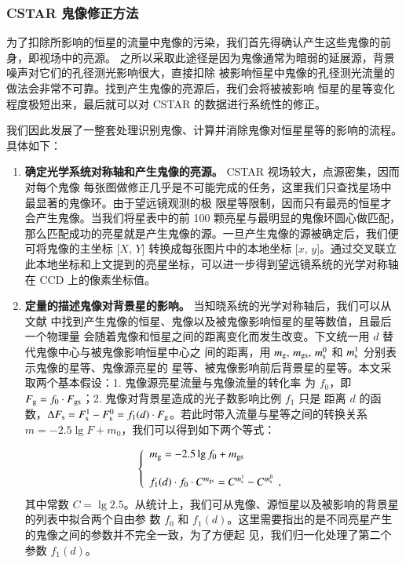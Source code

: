 \subsubsection{CSTAR 鬼像修正方法}

为了扣除所影响的恒星的流量中鬼像的污染，我们首先得确认产生这些鬼像的前身，即视场中的亮源。
之所以采取此途径是因为鬼像通常为暗弱的延展源，背景噪声对它们的孔径测光影响很大，直接扣除
被影响恒星中鬼像的孔径测光流量的做法会非常不可靠。找到产生鬼像的亮源后，我们会将被被影响
恒星的星等变化程度极短出来，最后就可以对 CSTAR 的数据进行系统性的修正。

我们因此发展了一整套处理识别鬼像、计算并消除鬼像对恒星星等的影响的流程。具体如下：

\begin{enumerate}[leftmargin=1\parindent]

\item \textbf{确定光学系统对称轴和产生鬼像的亮源。} CSTAR 视场较大，点源密集，因而对每个鬼像
每张图做修正几乎是不可能完成的任务，这里我们只查找星场中最显著的鬼像环。由于望远镜观测的极
限星等限制，因而只有最亮的恒星才会产生鬼像。当我们将星表中的前 100 颗亮星与最明显的鬼像环圆心做匹配，那么匹配成功的亮星就是产生鬼像的源。一旦产生鬼像的源被确定后，我们便可将鬼像的主坐标 [$X$, $Y$] 转换成每张图片中的本地坐标 [$x$, $y$]。通过交叉联立此本地坐标和上文提到的亮星坐标，可以进一步得到望远镜系统的光学对称轴在 CCD 上的像素坐标值。

\item \textbf{定量的描述鬼像对背景星的影响。} 当知晓系统的光学对称轴后，我们可以从文献 
 中找到产生鬼像的恒星、鬼像以及被鬼像影响恒星的星等数值，且最后一个物理量
会随着鬼像和恒星之间的距离变化而发生改变。下文统一用 $d$ 替代鬼像中心与被鬼像影响恒星中心之
间的距离，用 $m_\mathrm{g},\,m_\mathrm{gs},\,m_\mathrm{s}^0$ 和 $m_\mathrm{s}^1$ 分别表示鬼像的星等、鬼像源亮星的
星等、被鬼像影响前后背景星的星等。本文采取两个基本假设：1. 鬼像源亮星流量与鬼像流量的转化率
为 $f_0$，即 $F_{\rm{g}}=f_0\cdot F_{\rm{gs}}$；2. 鬼像对背景星造成的光子数影响比例 $f_1 $ 只是
距离 $d$ 的函数，$\Delta F_{\mathrm{s}}=F_{\mathrm{s}}^1-F_{\mathrm{s}}^0=f_1(d)\cdot F_{\mathrm{g}}$。若此时带入流量与星等之间的转换关系 $m=-2.5\lg F+m_0$，我们可以得到如下两个等式：

\begin{equation} \label{eq:ghostformular}
\left\{
\begin{array}{l}
m_{\mathrm{g}} = -2.5 \lg f_0 + m_{\mathrm{gs}} \\
\\ 
f_1(d) \cdot f_0 \cdot C^{m_{\mathrm{gs}}} = C^{m^1_{\mathrm{s}}}-C^{m^0_{\mathrm{s}}}  \, \ ,
\end{array} 
\right. 
\end{equation} %
其中常数 $C=\lg 2.5$。从统计上，我们可从鬼像、源恒星以及被影响的背景星的列表中拟合两个自由参
数 $f_0$ 和 $f_1(d)$。这里需要指出的是不同亮星产生的鬼像之间的参数并不完全一致，为了方便起
见，我们归一化处理了第二个参数 $f_1(d)$。


\end{enumerate}

